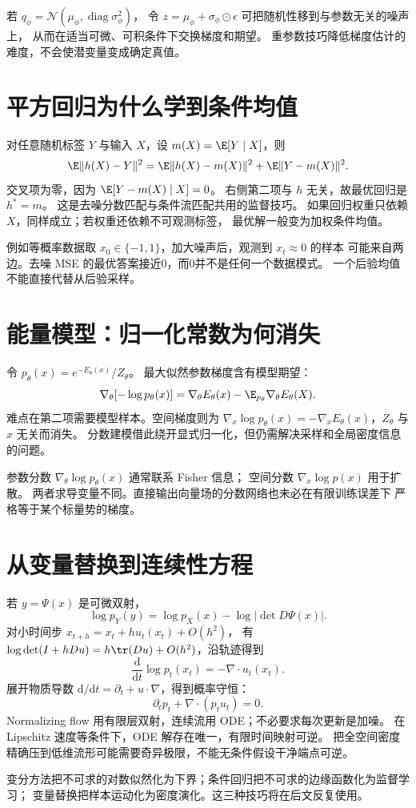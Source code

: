 若 $q_\phi=\mathcal N(\mu_\phi,\operatorname{diag}\sigma_\phi^2)$，
令 $z=\mu_\phi+\sigma_\phi\odot\epsilon$ 可把随机性移到与参数无关的噪声上，
从而在适当可微、可积条件下交换梯度和期望。
重参数技巧降低梯度估计的难度，不会使潜变量变成确定真值。

\section{平方回归为什么学到条件均值}

对任意随机标签 $Y$ 与输入 $X$，设 $m(X)=\E[Y\mid X]$，则
\begin{equation}\label{th:conditional-mean}
\E\|h(X)-Y\|^2
=\E\|h(X)-m(X)\|^2+\E\|Y-m(X)\|^2.
\end{equation}
交叉项为零，因为 $\E[Y-m(X)\mid X]=0$。
右侧第二项与 $h$ 无关，故最优回归是 $h^*=m$。
这是去噪分数匹配与条件流匹配共用的监督技巧。
如果回归权重只依赖 $X$，同样成立；若权重还依赖不可观测标签，
最优解一般变为加权条件均值。

例如等概率数据取 $x_0\in\{-1,1\}$，加大噪声后，观测到 $x_t\approx0$ 的样本
可能来自两边。去噪 MSE 的最优答案接近0，而0并不是任何一个数据模式。
一个后验均值不能直接代替从后验采样。

\section{能量模型：归一化常数为何消失}

令 $p_\theta(x)=e^{-E_\theta(x)}/Z_\theta$。
最大似然参数梯度含有模型期望：
\[
\nabla_\theta[-\log p_\theta(x)]
=\nabla_\theta E_\theta(x)-\E_{p_\theta}\nabla_\theta E_\theta(X).
\]
难点在第二项需要模型样本。空间梯度则为
$\nabla_x\log p_\theta(x)=-\nabla_x E_\theta(x)$，$Z_\theta$ 与 $x$ 无关而消失。
分数建模借此绕开显式归一化，但仍需解决采样和全局密度信息的问题。

参数分数 $\nabla_\theta\log p_\theta(x)$ 通常联系 Fisher 信息；
空间分数 $\nabla_x\log p(x)$ 用于扩散。
两者求导变量不同。直接输出向量场的分数网络也未必在有限训练误差下
严格等于某个标量势的梯度。

\section{从变量替换到连续性方程}

若 $y=\Psi(x)$ 是可微双射，
\[
\log p_Y(y)=\log p_X(x)-\log|\det D\Psi(x)|.
\]
对小时间步 $x_{t+h}=x_t+h u_t(x_t)+O(h^2)$，
有 $\log\det(I+hDu)=h\tr(Du)+O(h^2)$，沿轨迹得到
\begin{equation}\label{th:cnf-density}
\frac{\mathrm d}{\mathrm dt}\log p_t(x_t)=-\nabla\cdot u_t(x_t).
\end{equation}
展开物质导数 $\mathrm d/\mathrm dt=\partial_t+u\cdot\nabla$，得到概率守恒：
\begin{equation}\label{th:continuity}
\partial_t p_t+\nabla\cdot(p_tu_t)=0.
\end{equation}
Normalizing flow 用有限层双射，连续流用 ODE；不必要求每次更新是加噪。
在 Lipschitz 速度等条件下，ODE 解存在唯一，有限时间映射可逆。
把全空间密度精确压到低维流形可能需要奇异极限，不能无条件假设干净端点可逆。

\begin{theorytakeaway}
变分方法把不可求的对数似然化为下界；条件回归把不可求的边缘函数化为监督学习；
变量替换把样本运动化为密度演化。这三种技巧将在后文反复使用。
\end{theorytakeaway}
